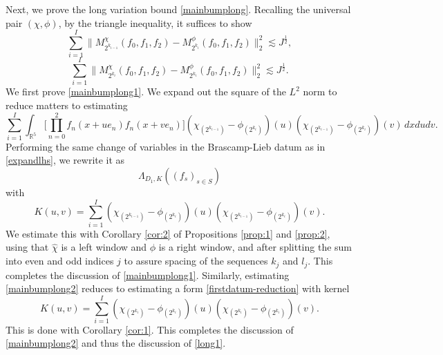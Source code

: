 \documentclass[12pt,reqno]{amsart}
\theoremstyle{plain}
\theoremstyle{definition}
\numberwithin{equation}{section}
\begin{document}
 
 
 Next, we prove  the long variation bound  \eqref{mainbumplong}.
Recalling the universal pair $(\chi,\phi)$, by the triangle inequality,
it suffices to show
\begin{equation}\label{mainbumplong1} \sum_{i=1}^{I} \|
M^{\chi}_{2^{k_{i-1}}}(f_0,f_1,f_2)-M^{\phi}_{2^{k_i}}(f_0,f_1,f_2) \|_{2}^2  \lesssim J^{\frac 12},\end{equation}
\begin{equation}\label{mainbumplong2} \sum_{i=1}^{I} \|M^{\chi}_{2^{k_i}}(f_0,f_1,f_2) - M^{\phi}_{2^{k_{i}}}(f_0,f_1,f_2)\|_{2}^2  \lesssim J^{\frac 12} .\end{equation}
We first prove \eqref{mainbumplong1}.
We expand out the square of the $L^2$ norm to reduce matters to estimating 
   \begin{equation}\label{longexpl}
   \sum_{i=1}^I  \int_{\mathbb{R}^5} \Big[\prod_{n=0}^2 f_n(x+ue_n) 
f_n(x+ve_n) \Big] 
({\chi}_{(2^{k_{i-1}})}-{\phi}_{(2^{k_{i}})})(u) ({\chi}_{(2^{k_{i-1}})}-{\phi}_{(2^{k_{i}})})(v)
 \,dx du dv. \end{equation} 
 Performing the same change of variables in the Brascamp-Lieb datum as in \eqref{expandlhs}, we rewrite it as
  \begin{equation}
      \label{firstdatum-reduction}
      \Lambda_{D_1,K}((f_s)_{s\in S})
  \end{equation}
with 
$$K(u,v)=\sum_{i=1}^I ({\chi}_{(2^{k_{i-1}})}-{\phi}_{(2^{k_{i}})})(u) ({\chi}_{(2^{k_{i-1}})}-{\phi}_{(2^{k_{i}})})(v).$$
We estimate this with Corollary \ref{cor:2} of Propositions \ref{prop:1} and \ref{prop:2}, using that $\widehat{\chi}$ is a left window
and $\widehat{\phi}$ is a right window, and after splitting the sum into
even and odd indices $j$ to assure spacing of the sequences $k_j$ and $l_j$.
This completes the discussion of \eqref{mainbumplong1}.  
Similarly, estimating \eqref{mainbumplong2} reduces to estimating
 a form \eqref{firstdatum-reduction} with kernel
$$K(u,v)=\sum_{i=1}^I ({\chi}_{(2^{k_{i}})}-{\phi}_{(2^{k_{i}})})(u) ({\chi}_{(2^{k_{i}})}-{\phi}_{(2^{k_{i}})})(v).$$
This is done with Corollary \ref{cor:1}.
 This completes the discussion of \eqref{mainbumplong2}
and thus the discussion of \eqref{long1}.
\end{document}
